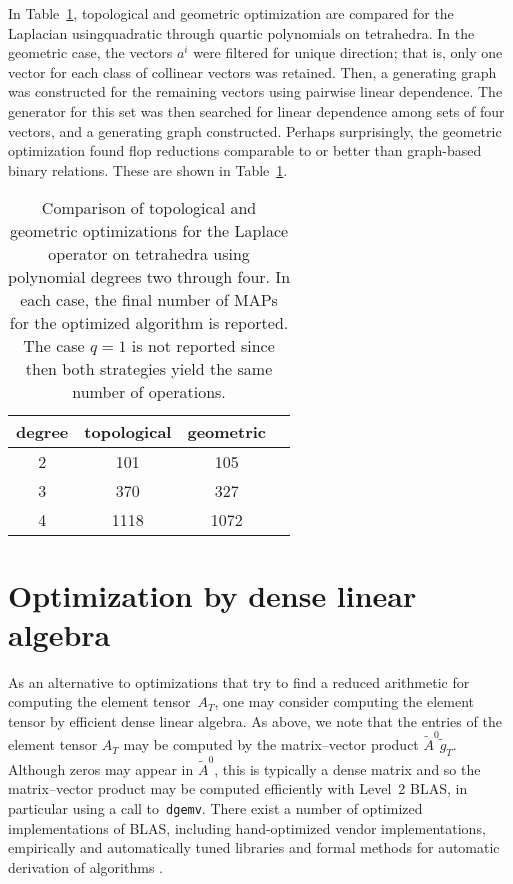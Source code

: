 In Table~\ref{tab:kirby-4:geom}, topological and geometric
optimization are compared for the Laplacian using\break quadratic through
quartic polynomials on tetrahedra. In the geometric case, the vectors
$a^i$ were filtered for unique direction; that is, only one vector for
each class of collinear vectors was retained. Then, a generating graph
was constructed for the remaining vectors using pairwise linear
dependence. The generator for this set was then searched for linear
dependence among sets of four vectors, and a generating graph
constructed. Perhaps surprisingly, the geometric optimization found
flop reductions comparable to or better than graph-based binary
relations. These are shown in Table~\ref{tab:kirby-4:geom}.

\begin{table}
  \centering
    \begin{tabular}{cccc}
      \toprule
      degree & topological & geometric \\
      \midrule
      2 & 101  & 105   \\
      3 & 370  & 327   \\
      4 & 1118 & 1072  \\
      \bottomrule
    \end{tabular}
    \caption{Comparison of topological and geometric optimizations
      for the Laplace operator on tetrahedra using polynomial degrees two
      through four. In each case, the final number of MAPs for the
      optimized algorithm is reported. The case $q=1$ is not reported
      since then both strategies yield the same number of operations.}
  \label{tab:kirby-4:geom}
\end{table}



\section{Optimization by dense linear algebra}

As an alternative to optimizations that try to find a reduced arithmetic
for computing the element tensor~$A_T$, one may consider computing
the element tensor by efficient dense linear algebra. As above, we
note that the entries of the element tensor $A_T$ may be computed by
the matrix--vector product $\tilde{A}^0 \tilde{g}_T$. Although zeros
may appear in $\tilde{A}^0$, this is typically a dense matrix and so
the matrix--vector product may be computed efficiently with Level~2
BLAS, in particular using a call to~\texttt{dgemv}. There exist a
number of optimized implementations of BLAS, including hand-optimized
vendor implementations, empirically and automatically tuned libraries
\citep{WhaleyPetitetDongarra2001} and formal methods for automatic
derivation of algorithms \citep{BientinesiGunnelsMyersEtAl2005}.

